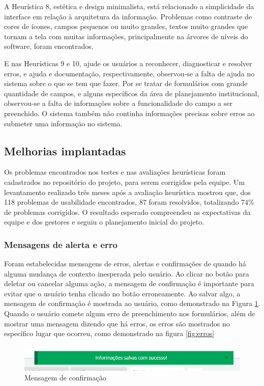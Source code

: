 A Heurística 8, estética e design minimalista, está relacionado a simplicidade da interface em relação à arquitetura da informação. Problemas como contraste de cores de ícones, campos pequenos ou muito grandes, textos muito grandes que tornam a tela com muitas informações, principalmente na árvores de níveis do software, foram encontrados.

E nas Heurísticas 9 e 10, ajude os usuários a reconhecer, diagnosticar e resolver erros, e ajuda e documentação, respectivamente,  observou-se a falta de ajuda no sistema sobre o que se tem que fazer. Por se tratar de formulários com grande quantidade de campos, e alguns específicos da área de planejamento institucional, observou-se a falta de informações sobre a funcionalidade do campo a ser preenchido. O sistema também não continha informações precisas sobre erros ao submeter uma informação no sistema.


\subsection{Melhorias implantadas}
Os problemas encontrados nos testes e nas avaliações heurísticas foram cadastrados no repositório do projeto, para serem corrigidos pela equipe. Um levantamento realizado três meses após a avaliação heurística mostrou que, dos 118 problemas de usabilidade encontrados, 87 foram resolvidos, totalizando 74\% de problemas corrigidos. O resultado esperado compreendeu as expectativas da equipe e dos gestores e seguiu o planejamento inicial do projeto. 

\subsubsection{Mensagens de alerta e erro}
Foram estabelecidas mensagens de erros, alertas e confirmações de quando há alguma mudança de contexto inesperada pelo usuário. Ao clicar no botão para deletar ou cancelar alguma ação, a mensagem de confirmação é importante para evitar que o usuário tenha clicado no botão erroneamente. Ao salvar algo, a mensagem de confirmação é mostrada ao usuário, como demonstrado na Figura \ref{fig:feedback1}. Quando o usuário comete algum erro de preenchimento nos formulários, além de mostrar uma mensagem dizendo que há erros, os erros são mostrados no específico lugar que ocorreu, como demonstrado na figura \ref{fig:erros}

\begin{figure}[H]
\centering
\includegraphics[width=1.1\textwidth]{images/feedback1.png}
\caption{Mensagem de confirmação}
\label{fig:feedback1}
\end{figure}

